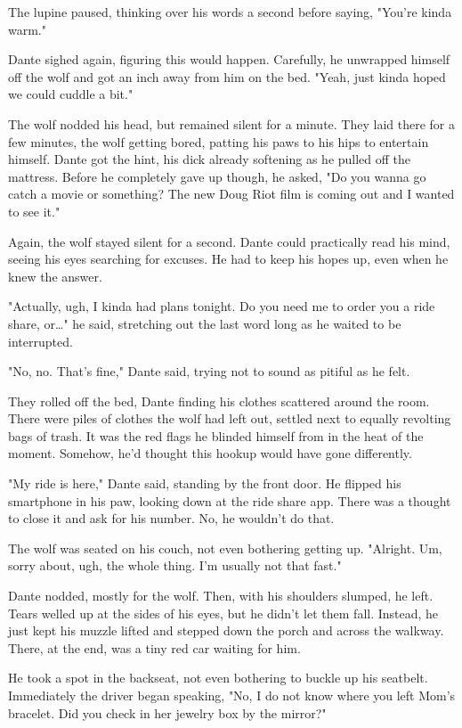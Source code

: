 The lupine paused, thinking over his words a second before saying, "You're kinda warm."

Dante sighed again, figuring this would happen. Carefully, he unwrapped himself off the wolf and got an inch away from him on the bed. "Yeah, just kinda hoped we could cuddle a bit."

The wolf nodded his head, but remained silent for a minute. They laid there for a few minutes, the wolf getting bored, patting his paws to his hips to entertain himself. Dante got the hint, his dick already softening as he pulled off the mattress. Before he completely gave up though, he asked, "Do you wanna go catch a movie or something? The new Doug Riot film is coming out and I wanted to see it."

Again, the wolf stayed silent for a second. Dante could practically read his mind, seeing his eyes searching for excuses. He had to keep his hopes up, even when he knew the answer.

"Actually, ugh, I kinda had plans tonight. Do you need me to order you a ride share, or\ldots" he said, stretching out the last word long as he waited to be interrupted.

"No, no. That's fine," Dante said, trying not to sound as pitiful as he felt.

They rolled off the bed, Dante finding his clothes scattered around the room. There were piles of clothes the wolf had left out, settled next to equally revolting bags of trash. It was the red flags he blinded himself from in the heat of the moment. Somehow, he'd thought this hookup would have gone differently.

"My ride is here," Dante said, standing by the front door. He flipped his smartphone in his paw, looking down at the ride share app. There was a thought to close it and ask for his number. No, he wouldn't do that.

The wolf was seated on his couch, not even bothering getting up. "Alright. Um, sorry about, ugh, the whole thing. I'm usually not that fast."

Dante nodded, mostly for the wolf. Then, with his shoulders slumped, he left. Tears welled up at the sides of his eyes, but he didn't let them fall. Instead, he just kept his muzzle lifted and stepped down the porch and across the walkway. There, at the end, was a tiny red car waiting for him.

He took a spot in the backseat, not even bothering to buckle up his seatbelt. Immediately the driver began speaking, "No, I do not know where you left Mom's bracelet. Did you check in her jewelry box by the mirror?"

